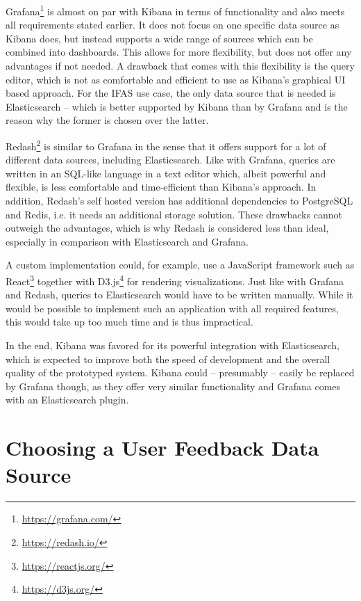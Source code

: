 Grafana\footnote{\url{https://grafana.com/}} is almost on par with Kibana in terms of functionality and also meets all requirements stated earlier.
It does not focus on one specific data source as Kibana does, but instead supports a wide range of sources which can be combined into dashboards.
This allows for more flexibility, but does not offer any advantages if not needed.
A drawback that comes with this flexibility is the query editor, which is not as comfortable and efficient to use as Kibana's graphical \ac{UI} based approach.
For the \ac{IFAS} use case, the only data source that is needed is Elasticsearch -- which is better supported by Kibana than by Grafana and is the reason why the former is chosen over the latter.

Redash\footnote{\url{https://redash.io/}} is similar to Grafana in the sense that it offers support for a lot of different data sources, including Elasticsearch.
Like with Grafana, queries are written in an \ac{SQL}-like language in a text editor which, albeit powerful and flexible, is less comfortable and time-efficient than Kibana's approach.
In addition, Redash's self hosted version has additional dependencies to PostgreSQL and Redis, i.e. it needs an additional storage solution.
These drawbacks cannot outweigh the advantages, which is why Redash is considered less than ideal, especially in comparison with Elasticsearch and Grafana.

A custom implementation could, for example, use a JavaScript framework such as React\footnote{\url{https://reactjs.org/}} together with D3.js\footnote{\url{https://d3js.org/}} for rendering visualizations.
Just like with Grafana and Redash, queries to Elasticsearch would have to be written manually.
While it would be possible to implement such an application with all required features, this would take up too much time and is thus impractical.

In the end, Kibana was favored for its powerful integration with Elasticsearch, which is expected to improve both the speed of development and the overall quality of the prototyped system.
Kibana could -- presumably -- easily be replaced by Grafana though, as they offer very similar functionality and Grafana comes with an Elasticsearch plugin.

\section{Choosing a User Feedback Data Source}
\label{sec:design:data-source}

